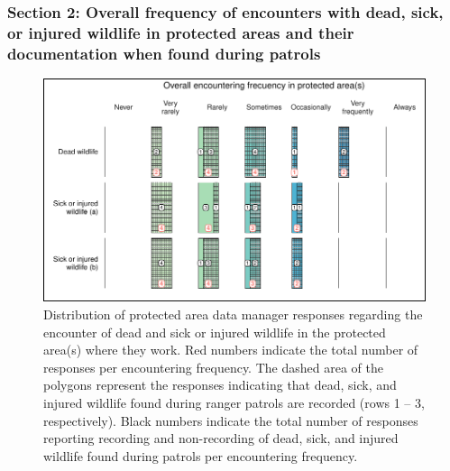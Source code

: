 \documentclass[
  letterpaper,
  DIV=11,
  numbers=noendperiod]{scrartcl}
\begin{document}
\hypertarget{section-2-overall-frequency-of-encounters-with-dead-sick-or-injured-wildlife-in-protected-areas-and-their-documentation-when-found-during-patrols}{%
\subsubsection{Section 2: Overall frequency of encounters with dead,
sick, or injured wildlife in protected areas and their documentation
when found during
patrols}\label{section-2-overall-frequency-of-encounters-with-dead-sick-or-injured-wildlife-in-protected-areas-and-their-documentation-when-found-during-patrols}}

\begin{figure}[H]

{\centering \includegraphics{Appendix_final_files/figure-pdf/section 2A plot-1.pdf}

}

\caption{Distribution of protected area data manager responses regarding
the encounter of dead and sick or injured wildlife in the protected
area(s) where they work. Red numbers indicate the total number of
responses per encountering frequency. The dashed area of the polygons
represent the responses indicating that dead, sick, and injured wildlife
found during ranger patrols are recorded (rows 1 -- 3, respectively).
Black numbers indicate the total number of responses reporting recording
and non-recording of dead, sick, and injured wildlife found during
patrols per encountering frequency.}

\end{figure}
\end{document}
